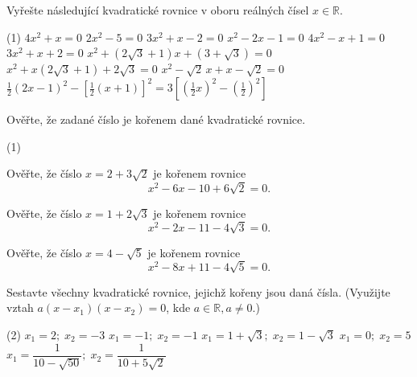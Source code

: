 \documentclass[12pt,a4paper]{article}
\begin{document}
\exercisepart
\setcounter{section}{1}

\begin{exercise}

Vyřešte následující kvadratické rovnice v oboru reálných čísel \(x \in \mathbb{R}\).

\begin{tasks}(1)
    \task \(4x^2 + x = 0\)
    \task \(2x^2 - 5 = 0\)
    \task \(3x^2 + x - 2 = 0\)
    \task \(x^2 - 2x - 1 = 0\)
    \task \(4x^2 - x + 1 = 0\)
    \task \(3x^2 + x + 2 = 0\)
    \task \(x^2 + (2\sqrt{3} + 1)x + (3 + \sqrt{3}) = 0\)
    \task \(x^2 + x(2\sqrt{3} + 1) + 2\sqrt{3} = 0\)
    \task \(x^2 - \sqrt{2}\,x + x - \sqrt{2} = 0\)
    \task 
    $
    \frac12(2x - 1)^2 - \left[\frac12(x+1)\right]^2
    =
    3\left[\left(\frac12 x\right)^2 - \left(\frac12\right)^2\right]
    $
\end{tasks}
\end{exercise}


\begin{exercise}
Ověřte, že zadané číslo je kořenem dané kvadratické rovnice.

\begin{tasks}(1)

  \task Ověřte, že číslo \(x = 2 + 3\sqrt{2}\) je kořenem rovnice  
  \[
  x^2 - 6x - 10 + 6\sqrt{2} = 0.
  \]

  \task Ověřte, že číslo \(x = 1 + 2\sqrt{3}\) je kořenem rovnice  
  \[
  x^2 - 2x - 11 - 4\sqrt{3} = 0.
  \]

  \task Ověřte, že číslo \(x = 4 - \sqrt{5}\) je kořenem rovnice  
  \[
  x^2 - 8x + 11 - 4\sqrt{5} = 0.
  \]

\end{tasks}

\end{exercise}


\begin{exercise}
Sestavte všechny kvadratické rovnice, jejichž kořeny jsou daná čísla.  
(Využijte vztah \(a(x - x_1)(x - x_2) = 0\), kde \(a \in \mathbb{R}, a \neq 0\).)

\begin{tasks}(2)
  \task \(x_1 = 2;\; x_2 = -3\)
  \task \(x_1 = -1;\; x_2 = -1\)
  \task \(x_1 = 1+\sqrt{3};\; x_2 = 1-\sqrt{3}\)
  \task \(x_1 = 0;\; x_2 = 5\)
  \task \(x_1 = \dfrac{1}{10-\sqrt{50}};\; x_2 = \dfrac{1}{10+5\sqrt{2}}\)
\end{tasks}

\end{exercise}
\end{document}
